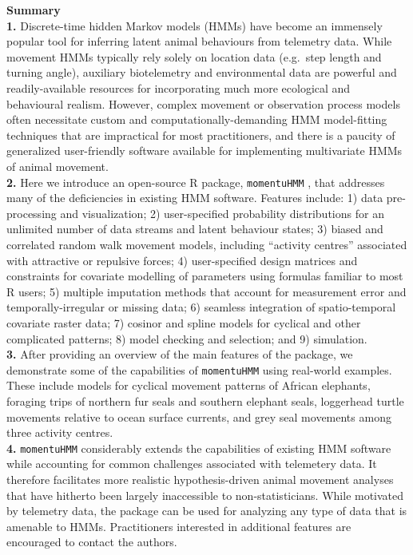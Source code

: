 \documentclass[12pt]{article}\usepackage[]{graphicx}\usepackage[]{color}
\begin{document}
\noindent \textbf{Summary}\\
\textbf{1.} Discrete-time hidden Markov models (HMMs) have become an immensely popular tool for inferring latent animal behaviours from telemetry data. While movement HMMs typically rely solely on location data (e.g.\ step length and turning angle), auxiliary biotelemetry and environmental data are powerful and readily-available resources for incorporating much more ecological and behavioural realism. However, complex movement or observation process models often necessitate custom and computationally-demanding HMM model-fitting techniques that are impractical for most practitioners, and there is a paucity of generalized user-friendly software available for implementing multivariate HMMs of animal movement.\\
\textbf{2.} Here we introduce an open-source R package, \verb|momentuHMM|%
, that addresses many of the deficiencies in existing HMM software.  Features include: 1) data pre-processing and visualization; 2) user-specified probability distributions for an unlimited number of data streams and latent behaviour states; %
3) biased and correlated random walk movement models, including ``activity centres'' associated with attractive or repulsive forces; 4) user-specified design matrices and constraints for covariate modelling of parameters using formulas familiar to most R users; 5) multiple imputation methods that account for measurement error and temporally-irregular or missing data; 6) seamless integration of spatio-temporal covariate raster data; 7) cosinor and spline models for cyclical and other complicated patterns; 8) model checking and selection; and 9) simulation.\\%
\textbf{3.} %
After providing an overview of the main features of the package, we demonstrate some of the capabilities of \verb|momentuHMM| using real-world examples. These include models for cyclical movement patterns of African elephants, foraging trips of northern fur seals and southern elephant seals, loggerhead turtle movements relative to ocean surface currents, and grey seal movements among three activity centres.
\\
\textbf{4.} \verb|momentuHMM| considerably extends the capabilities of existing HMM software while accounting for common challenges associated with telemetery data. It therefore facilitates more realistic hypothesis-driven animal movement analyses that have hitherto been largely inaccessible to non-statisticians.  While motivated by telemetry data, the package can be used for analyzing any type of data that is amenable to HMMs. Practitioners interested in additional features are encouraged to contact the authors. %
\\
\end{document}
